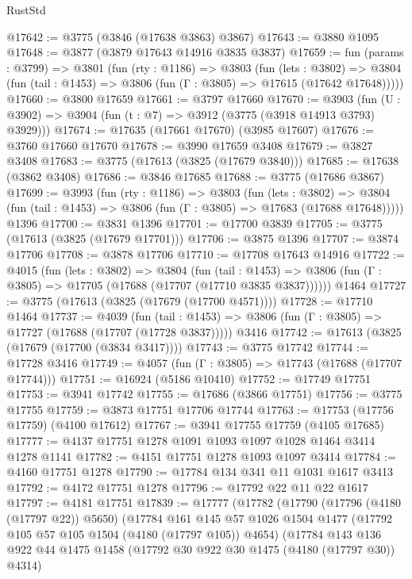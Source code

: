 \begin{lexlean}{RustStd}
\begin{coremodule}
@17642 := @3775 (@3846 (@17638 @3863) @3867)
@17643 := @3880 @1095
@17648 := @3877 (@3879 @17643 @14916 @3835 @3837)
@17659 := fun (params : @3799) =>
  @3801
    (fun (rty : @1186) =>
    @3803
      (fun (lets : @3802) =>
      @3804 (fun (tail : @1453) => @3806 (fun (Γ : @3805) => @17615 (@17642 @17648)))))
@17660 := @3800 @17659
@17661 := @3797 @17660
@17670 := @3903
    (fun (U : @3902) => @3904 (fun (t : @7) => @3912 (@3775 (@3918 @14913 @3793) @3929)))
@17674 := @17635 (@17661 @17670) (@3985 @17607)
@17676 := @3760 @17660 @17670
@17678 := @3990 @17659 @3408
@17679 := @3827 @3408
@17683 := @3775 (@17613 (@3825 (@17679 @3840)))
@17685 := @17638 (@3862 @3408)
@17686 := @3846 @17685
@17688 := @3775 (@17686 @3867)
@17699 := @3993
    (fun (rty : @1186) =>
    @3803
      (fun (lets : @3802) =>
      @3804 (fun (tail : @1453) => @3806 (fun (Γ : @3805) => @17683 (@17688 @17648)))))
    @1396
@17700 := @3831 @1396
@17701 := @17700 @3839
@17705 := @3775 (@17613 (@3825 (@17679 @17701)))
@17706 := @3875 @1396
@17707 := @3874 @17706
@17708 := @3878 @17706
@17710 := @17708 @17643 @14916
@17722 := @4015
    (fun (lets : @3802) =>
    @3804
      (fun (tail : @1453) =>
      @3806 (fun (Γ : @3805) => @17705 (@17688 (@17707 (@17710 @3835 @3837))))))
    @1464
@17727 := @3775 (@17613 (@3825 (@17679 (@17700 @4571))))
@17728 := @17710 @1464
@17737 := @4039
    (fun (tail : @1453) => @3806 (fun (Γ : @3805) => @17727 (@17688 (@17707 (@17728 @3837)))))
    @3416
@17742 := @17613 (@3825 (@17679 (@17700 (@3834 @3417))))
@17743 := @3775 @17742
@17744 := @17728 @3416
@17749 := @4057 (fun (Γ : @3805) => @17743 (@17688 (@17707 @17744)))
@17751 := @16924 (@5186 @10410)
@17752 := @17749 @17751
@17753 := @3941 @17742
@17755 := @17686 (@3866 @17751)
@17756 := @3775 @17755
@17759 := @3873 @17751 @17706 @17744
@17763 := @17753 (@17756 @17759) (@4100 @17612)
@17767 := @3941 @17755 @17759 (@4105 @17685)
@17777 := @4137 @17751 @1278 @1091 @1093 @1097 @1028 @1464 @3414 @1278 @1141
@17782 := @4151 @17751 @1278 @1093 @1097 @3414
@17784 := @4160 @17751 @1278
@17790 := @17784 @134 @341 @11 @1031 @1617 @3413
@17792 := @4172 @17751 @1278
@17796 := @17792 @22 @11 @22 @1617
@17797 := @4181 @17751
@17839 := @17777
    (@17782
      (@17790
        (@17796 (@4180 (@17797 @22)) @5650)
        (@17784
          @161
          @145
          @57
          @1026
          @1504
          @1477
          (@17792 @105 @57 @105 @1504 (@4180 (@17797 @105)) @4654)
          (@17784
            @143
            @136
            @922
            @44
            @1475
            @1458
            (@17792 @30 @922 @30 @1475 (@4180 (@17797 @30)) @4314)

\end{coremodule}
\end{lexlean}
